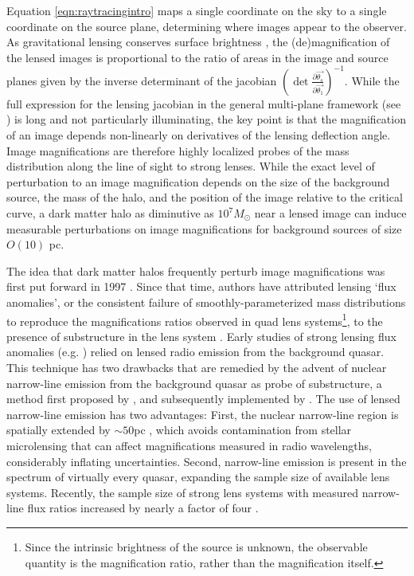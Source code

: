 Equation \ref{eqn:raytracingintro} maps a single coordinate on the sky to a single coordinate on the source plane, determining where images appear to the observer. As gravitational lensing conserves surface brightness \cite{MisnerThorneWheeler}, the (de)magnification of the lensed images is proportional to the ratio of areas in the image and source planes given by the inverse determinant of the jacobian $\left(\det \frac{\partial \vec{\theta_s}}{\partial \vec{\theta_1}}\right)^{-1}$. While the full expression for the lensing jacobian in the general multi-plane framework (see \cite{BlandfordNarayan86}) is long and not particularly illuminating, the key point is that the magnification of an image depends non-linearly on derivatives of the lensing deflection angle. Image magnifications are therefore highly localized probes of the mass distribution along the line of sight to strong lenses. While the exact level of perturbation to an image magnification depends on the size of the background source, the mass of the halo, and the position of the image relative to the critical curve, a dark matter halo as diminutive as $10^7 M_{\odot}$ near a lensed image can induce measurable perturbations on image magnifications for background sources of size $O\left(10\right)$ pc. 

The idea that dark matter halos frequently perturb image magnifications was first put forward in 1997 \cite{MaoSchneider98}. Since that time, authors have attributed lensing `flux anomalies', or the consistent failure of smoothly-parameterized mass distributions to reproduce the magnifications ratios observed in quad lens systems\footnote{Since the intrinsic brightness of the source is unknown, the observable quantity is the magnification ratio, rather than the magnification itself.}, to the presence of substructure in the lens system \cite{Metcalf++02,D+K02,Xu++12,Xu++15}. Early studies of strong lensing flux anomalies (e.g. \cite{D+K02}) relied on lensed radio emission from the background quasar. This technique has two drawbacks that are remedied by the advent of nuclear narrow-line emission from the background quasar as probe of substructure, a method first proposed by \cite{MoustakasMetcalf02}, and subsequently implemented by \cite{Sugai++07,Nierenberg++14,Nierenberg++17,Nierenberg++19}. The use of lensed narrow-line emission has two advantages: First, the nuclear narrow-line region is spatially extended by $\sim 50$pc \cite{MullerSanchez++11}, which avoids contamination from stellar microlensing that can affect magnifications measured in radio wavelengths, considerably inflating uncertainties. Second, narrow-line emission is present in the spectrum of virtually every quasar, expanding the sample size of available lens systems. Recently, the sample size of strong lens systems with measured narrow-line flux ratios increased by nearly a factor of four \cite{Nierenberg++19}. 


